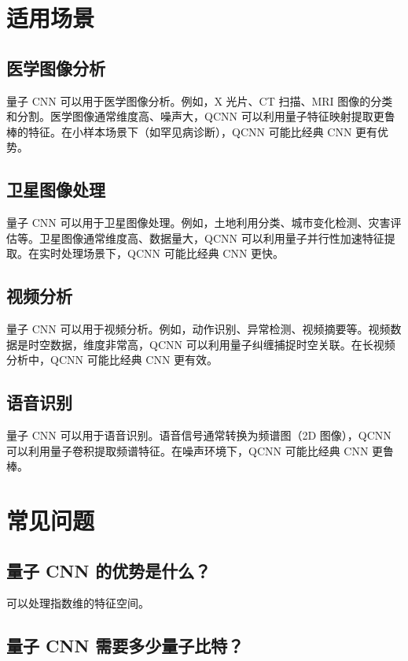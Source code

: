 \documentclass[12pt,a4paper]{article}
\begin{document}
\section{适用场景}

\subsection{医学图像分析}

量子 CNN 可以用于医学图像分析。例如，X 光片、CT 扫描、MRI 图像的分类和分割。医学图像通常维度高、噪声大，QCNN 可以利用量子特征映射提取更鲁棒的特征。在小样本场景下（如罕见病诊断），QCNN 可能比经典 CNN 更有优势。

\subsection{卫星图像处理}

量子 CNN 可以用于卫星图像处理。例如，土地利用分类、城市变化检测、灾害评估等。卫星图像通常维度高、数据量大，QCNN 可以利用量子并行性加速特征提取。在实时处理场景下，QCNN 可能比经典 CNN 更快。

\subsection{视频分析}

量子 CNN 可以用于视频分析。例如，动作识别、异常检测、视频摘要等。视频数据是时空数据，维度非常高，QCNN 可以利用量子纠缠捕捉时空关联。在长视频分析中，QCNN 可能比经典 CNN 更有效。

\subsection{语音识别}

量子 CNN 可以用于语音识别。语音信号通常转换为频谱图（2D 图像），QCNN 可以利用量子卷积提取频谱特征。在噪声环境下，QCNN 可能比经典 CNN 更鲁棒。

\section{常见问题}

\subsection{量子 CNN 的优势是什么？}

可以处理指数维的特征空间。

\subsection{量子 CNN 需要多少量子比特？}
\end{document}
